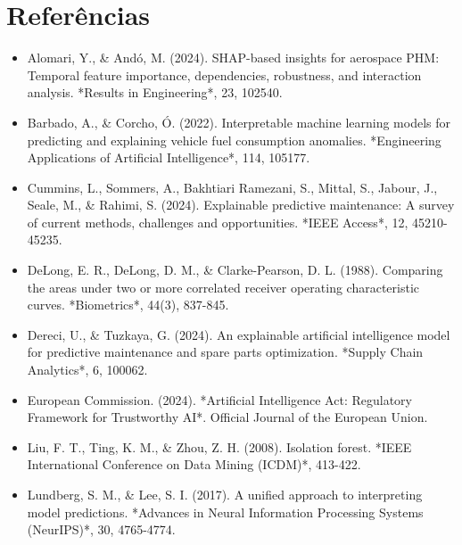 \documentclass[10pt,a4paper,journal]{article}
\begin{document}
\section{Referências}
\begin{itemize}
\item Alomari, Y., \& Andó, M. (2024). SHAP-based insights for aerospace PHM: Temporal feature importance, dependencies, robustness, and interaction analysis. *Results in Engineering*, 23, 102540.
\end{itemize}
\begin{itemize}
\item Barbado, A., \& Corcho, Ó. (2022). Interpretable machine learning models for predicting and explaining vehicle fuel consumption anomalies. *Engineering Applications of Artificial Intelligence*, 114, 105177.
\end{itemize}
\begin{itemize}
\item Cummins, L., Sommers, A., Bakhtiari Ramezani, S., Mittal, S., Jabour, J., Seale, M., \& Rahimi, S. (2024). Explainable predictive maintenance: A survey of current methods, challenges and opportunities. *IEEE Access*, 12, 45210-45235.
\end{itemize}
\begin{itemize}
\item DeLong, E. R., DeLong, D. M., \& Clarke-Pearson, D. L. (1988). Comparing the areas under two or more correlated receiver operating characteristic curves. *Biometrics*, 44(3), 837-845.
\end{itemize}
\begin{itemize}
\item Dereci, U., \& Tuzkaya, G. (2024). An explainable artificial intelligence model for predictive maintenance and spare parts optimization. *Supply Chain Analytics*, 6, 100062.
\end{itemize}
\begin{itemize}
\item European Commission. (2024). *Artificial Intelligence Act: Regulatory Framework for Trustworthy AI*. Official Journal of the European Union.
\end{itemize}
\begin{itemize}
\item Liu, F. T., Ting, K. M., \& Zhou, Z. H. (2008). Isolation forest. *IEEE International Conference on Data Mining (ICDM)*, 413-422.
\end{itemize}
\begin{itemize}
\item Lundberg, S. M., \& Lee, S. I. (2017). A unified approach to interpreting model predictions. *Advances in Neural Information Processing Systems (NeurIPS)*, 30, 4765-4774.
\end{itemize}
\end{document}
